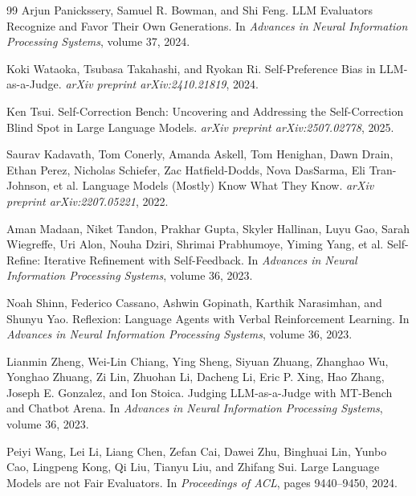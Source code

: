 \documentclass[10pt]{article}
\begin{document}
\begin{thebibliography}{99}
Arjun Panickssery, Samuel R. Bowman, and Shi Feng.
\newblock LLM Evaluators Recognize and Favor Their Own Generations.
\newblock In \emph{Advances in Neural Information Processing Systems}, volume 37, 2024.

Koki Wataoka, Tsubasa Takahashi, and Ryokan Ri.
\newblock Self-Preference Bias in LLM-as-a-Judge.
\newblock \emph{arXiv preprint arXiv:2410.21819}, 2024.

Ken Tsui.
\newblock Self-Correction Bench: Uncovering and Addressing the Self-Correction Blind Spot in Large Language Models.
\newblock \emph{arXiv preprint arXiv:2507.02778}, 2025.

Saurav Kadavath, Tom Conerly, Amanda Askell, Tom Henighan, Dawn Drain, Ethan Perez, Nicholas Schiefer, Zac Hatfield-Dodds, Nova DasSarma, Eli Tran-Johnson, et al.
\newblock Language Models (Mostly) Know What They Know.
\newblock \emph{arXiv preprint arXiv:2207.05221}, 2022.

Aman Madaan, Niket Tandon, Prakhar Gupta, Skyler Hallinan, Luyu Gao, Sarah Wiegreffe, Uri Alon, Nouha Dziri, Shrimai Prabhumoye, Yiming Yang, et al.
\newblock Self-Refine: Iterative Refinement with Self-Feedback.
\newblock In \emph{Advances in Neural Information Processing Systems}, volume 36, 2023.

Noah Shinn, Federico Cassano, Ashwin Gopinath, Karthik Narasimhan, and Shunyu Yao.
\newblock Reflexion: Language Agents with Verbal Reinforcement Learning.
\newblock In \emph{Advances in Neural Information Processing Systems}, volume 36, 2023.

Lianmin Zheng, Wei-Lin Chiang, Ying Sheng, Siyuan Zhuang, Zhanghao Wu, Yonghao Zhuang, Zi Lin, Zhuohan Li, Dacheng Li, Eric P. Xing, Hao Zhang, Joseph E. Gonzalez, and Ion Stoica.
\newblock Judging LLM-as-a-Judge with MT-Bench and Chatbot Arena.
\newblock In \emph{Advances in Neural Information Processing Systems}, volume 36, 2023.

Peiyi Wang, Lei Li, Liang Chen, Zefan Cai, Dawei Zhu, Binghuai Lin, Yunbo Cao, Lingpeng Kong, Qi Liu, Tianyu Liu, and Zhifang Sui.
\newblock Large Language Models are not Fair Evaluators.
\newblock In \emph{Proceedings of ACL}, pages 9440--9450, 2024.


\end{thebibliography}
\end{document}
